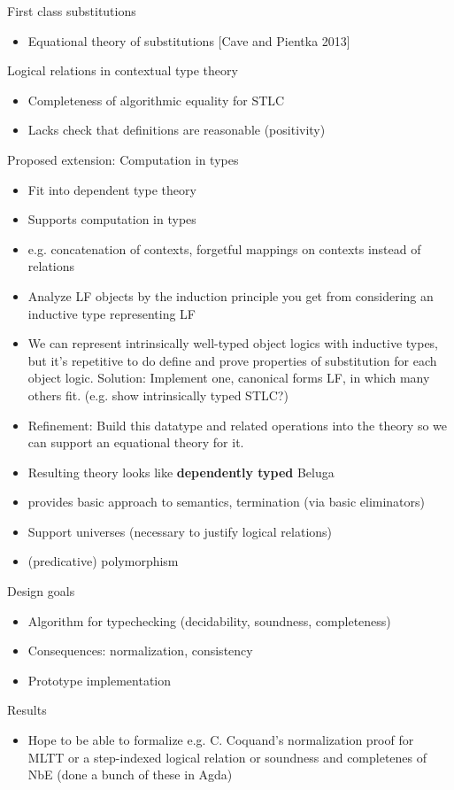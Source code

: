 \documentclass[usenames,dvipsnames]{beamer}
\begin{document}
\begin{frame}{First class substitutions}
\begin{itemize}
\item Equational theory of substitutions
[Cave and Pientka 2013]
\end{itemize}
\end{frame}

\begin{frame}{Logical relations in contextual type theory}
\begin{itemize}
\item Completeness of algorithmic equality for STLC
\item Lacks check that definitions are reasonable (positivity)
\end{itemize}
\end{frame}

\begin{frame}{Proposed extension: Computation in types}
\begin{itemize}
\item Fit into dependent type theory
\item Supports computation in types
\item e.g. concatenation of contexts, forgetful mappings on contexts instead of relations
\item Analyze LF objects by the induction principle you get from considering an inductive type representing LF
\item We can represent intrinsically well-typed object logics with inductive types, but it's repetitive to do define and prove properties of substitution for each object logic. Solution: Implement one, canonical forms LF, in which many others fit. (e.g. show intrinsically typed STLC?)
\item Refinement: Build this datatype and related operations into the theory so we can support an equational theory for it.
\item Resulting theory looks like \textbf{dependently typed} Beluga
\item provides basic approach to semantics, termination (via basic eliminators)
\item Support universes (necessary to justify logical relations)
\item (predicative) polymorphism
\end{itemize}
\end{frame}

\begin{frame}{Design goals}
\begin{itemize}
\item Algorithm for typechecking (decidability, soundness, completeness)
\item Consequences: normalization, consistency
\item Prototype implementation
\end{itemize}
\end{frame}

\begin{frame}{Results}
\begin{itemize}
\item Hope to be able to formalize e.g. C. Coquand's normalization proof for MLTT or a step-indexed logical relation or soundness and completenes of NbE (done a bunch of these in Agda)
\end{itemize}
\end{frame}
\end{document}
